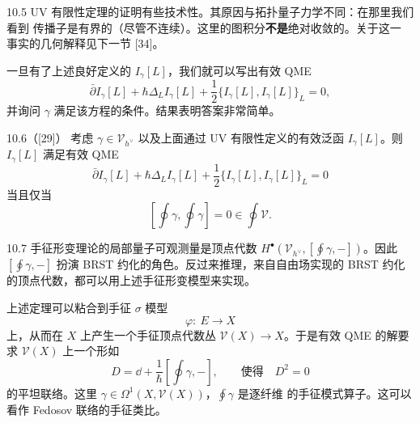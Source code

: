 \begin{wrem}{10.5}
  UV 有限性定理的证明有些技术性。其原因与拓扑量子力学不同：在那里我们看到
  传播子是有界的（尽管不连续）。这里的图积分\textbf{不是}绝对收敛的。关于这一
  事实的几何解释见下一节 [34]。
\end{wrem}

一旦有了上述良好定义的 $I_\gamma[L]$，我们就可以写出有效 QME
\[
  \bar\partial I_\gamma[L]+\hbar\Delta_LI_\gamma[L]
  +\frac{1}{2}\{I_\gamma[L],I_\gamma[L]\}_L=0,
\]
并询问 $\gamma$ 满足该方程的条件。结果表明答案非常简单。

\begin{wthm}{10.6（[29]）}
  考虑 $\gamma\in\mathcal{V}_{h^\vee}$ 以及上面通过 UV 有限性定义的有效泛函
  $I_\gamma[L]$。则 $I_\gamma[L]$ 满足有效 QME
  \[
    \bar\partial I_\gamma[L]+\hbar\Delta_LI_\gamma[L]
    +\frac{1}{2}\{I_\gamma[L],I_\gamma[L]\}_L=0
  \]
  当且仅当
  \[
    \left[\oint\gamma,\oint\gamma\right]=0\in\oint\mathcal{V}.
  \]
\end{wthm}


\begin{wrem}{10.7}
  手征形变理论的局部量子可观测量是顶点代数
  $H^\bullet(\mathcal{V}_{h^\vee},[\oint\gamma,-])$。因此
  $[\oint\gamma,-]$ 扮演 BRST 约化的角色。反过来推理，来自自由场实现的 BRST
  约化的顶点代数，都可以用上述手征形变模型来实现。
\end{wrem}

上述定理可以粘合到手征 $\sigma$ 模型
\[
  \varphi:\ E\longrightarrow X
\]
上，从而在 $X$ 上产生一个手征顶点代数丛 $\mathcal{V}(X)\to X$。于是有效 QME
的解要求 $\mathcal{V}(X)$ 上一个形如
\[
  D=\dd+\frac{1}{\hbar}\left[\oint\gamma,-\right],
  \qquad\text{使得}\quad D^2=0
\]
的平坦联络。这里 $\gamma\in\Omega^1(X,\mathcal{V}(X))$，$\oint\gamma$ 是逐纤维
的手征模式算子。这可以看作 Fedosov 联络的手征类比。


